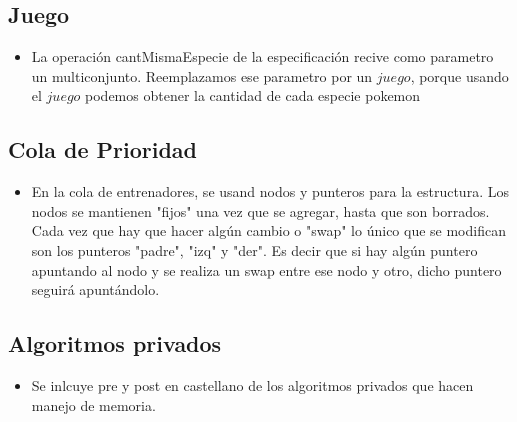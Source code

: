 
\subsection{Juego}

\begin{itemize}
\item{La operaci\'on cantMismaEspecie de la especificaci\'on recive como parametro un multiconjunto. 
Reemplazamos ese parametro por un $juego$, porque usando el $juego$ podemos obtener la cantidad de cada especie pokemon}

\end{itemize}

\subsection{Cola de Prioridad}

\begin{itemize}
\item{En la cola de entrenadores, se usand nodos y punteros para la estructura. Los nodos se mantienen "fijos" una vez que se agregar, hasta que son borrados. Cada vez que hay que hacer alg\'un cambio o "swap" lo \'unico que se modifican son los punteros "padre", "izq" y "der". Es decir que si hay alg\'un puntero apuntando al nodo y se realiza un swap entre ese nodo y otro, dicho puntero seguir\'a apunt\'andolo.}

\end{itemize}


\subsection{Algoritmos privados}

\begin{itemize}

\item{Se inlcuye pre y post en castellano de los algoritmos privados que hacen manejo de memoria.}

\end{itemize}

